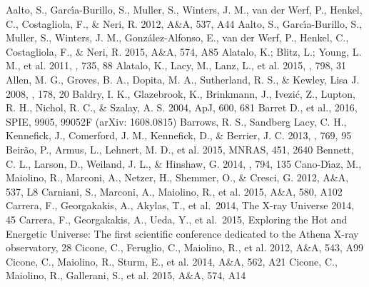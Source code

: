 \documentclass{pasa}%
\begin{document}
\begin{thebibliography}{}
   Aalto, S., Garc\'{\i}a-Burillo, S.,
    Muller, S., Winters, J. M., van der Werf, P., Henkel, C., 
    Costagliola, F., \& Neri, R. 2012, A\&A, 537, A44
   Aalto, S., Garc\'{\i}a-Burillo, S.,
    Muller, S., Winters, J. M., Gonz\'alez-Alfonso, E., van der Werf, P.,
    Henkel, C., Costagliola, F., \& Neri, R. 2015, A\&A, 574, A85 
   Alatalo, K.; Blitz, L.; Young, L. M.,
    et al. 2011, \apj, 735, 88 
   Alatalo, K., Lacy, M., Lanz,
    L., et al. 2015, \apj, 798, 31 
   Allen, M. G., Groves, B. A., Dopita,
    M. A., Sutherland, R. S., \& Kewley, Lisa J. 2008, \apjs, 178, 20
   Baldry, I. K., Glazebrook, K.,
    Brinkmann, J., Ivezi\'c, Z., Lupton, R. H., Nichol, R. C., \& Szalay,
    A. S. 2004, ApJ, 600, 681
   Barret D., et al., 2016, SPIE, 9905,
    99052F (arXiv: 1608.0815) 
   Barrows, R. S., Sandberg Lacy, C. H.,
    Kennefick, J., Comerford, J. M., Kennefick, D., \& Berrier, J. C. 2013,
    \apj, 769, 95
   Beir\~ao, P., Armus, L., Lehnert,
    M. D., et al. 2015, MNRAS, 451, 2640
   Bennett, C. L., Larson, D., Weiland,
    J. L., \& Hinshaw, G. 2014, \apj, 794, 135
   Cano-D\'{\i}az, M.,
    Maiolino, R., Marconi, A., Netzer, H., Shemmer, O., \& Cresci, G. 2012,
    A\&A, 537, L8 
   Carniani, S., Marconi, A., Maiolino,
    R., et al. 2015, A\&A, 580, A102
   Carrera, F., Georgakakis, A., Akylas,
    T., et al.\ 2014, The X-ray Universe 2014, 45  
   Carrera, F., Georgakakis, A., Ueda,
    Y., et al.\ 2015, Exploring the Hot and Energetic Universe: The first
    scientific conference dedicated to the Athena X-ray observatory, 28  
   Cicone, C., Feruglio, C., Maiolino, R.,
    et al. 2012, A\&A, 543, A99
   Cicone, C., Maiolino, R., Sturm, E., et
    al. 2014, A\&A, 562, A21
   Cicone, C., Maiolino, R., Gallerani,
    S., et al. 2015, A\&A, 574, A14 

\end{thebibliography}
\end{document}
